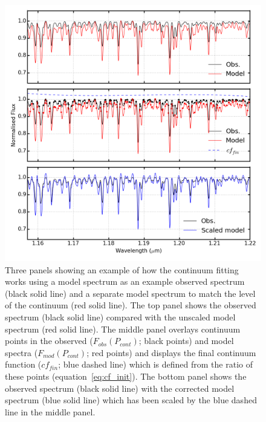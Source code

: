 \begin{figure}
 \centering
\includegraphics[width=\textwidth]{JAnal/cw-3panels}
\caption[Three panels demonstrating the continuum fitting procedure]{
Three panels showing an example of how the continuum fitting works using a model spectrum as an example observed spectrum (black solid line) and a separate model spectrum to match the level of the continuum (red solid line).
The top panel shows the observed spectrum (black solid line) compared with the unscaled model spectrum (red solid line).
The middle panel overlays continuum points in the observed ($F_{obs}(P_{cont})$; black points) and model spectra ($F_{mod}(P_{cont})$; red points) and displays the final continuum function ($cf_{fin}$; blue dashed line) which is defined from the ratio of these points (equation~\ref{eq:cf_init}).
The bottom panel shows the observed spectrum (black solid line) with the corrected model spectrum (blue solid line) which has been scaled by the blue dashed line in the middle panel.
\label{fig:cft3pan}}
\end{figure}

